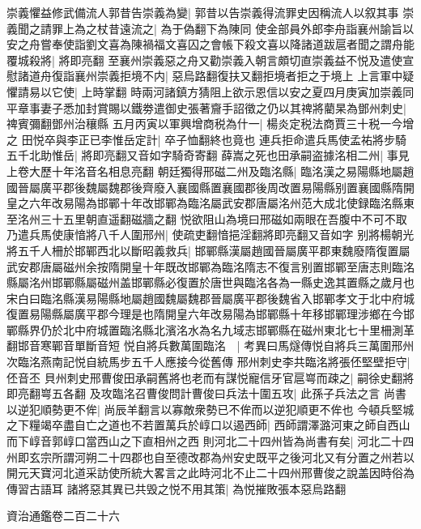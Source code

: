 崇義懼益修武備流人郭昔告崇義為變|{
	郭昔以告崇義得流罪史因稱流人以叙其事}
崇義聞之請罪上為之杖昔遠流之|{
	為于偽翻下為陳同}
使金部員外郎李舟詣襄州諭旨以安之舟嘗奉使詣劉文喜為陳禍福文喜囚之會帳下殺文喜以降諸道跋扈者聞之謂舟能覆城殺將|{
	將即亮翻}
至襄州崇義惡之舟又勸崇義入朝言頗切直崇義益不悦及遣使宣慰諸道舟復詣襄州崇義拒境不内|{
	惡烏路翻復扶又翻拒境者拒之于境上}
上言軍中疑懼請易以它使|{
	上時掌翻}
時兩河諸鎮方猜阻上欲示恩信以安之夏四月庚寅加崇義同平章事妻子悉加封賞賜以鐵劵遣御史張著齎手詔徵之仍以其禆將藺杲為鄧州刺史|{
	禆賓彌翻鄧州治穰縣}
五月丙寅以軍興增商税為什一|{
	楊炎定税法商賈三十税一今增之}
田悦卒與李正已李惟岳定計|{
	卒子恤翻終也竟也}
連兵拒命遣兵馬使孟祐將步騎五千北助惟岳|{
	將即亮翻又音如字騎奇寄翻}
薛嵩之死也田承嗣盗據洺相二州|{
	事見上卷大歷十年洺音名相息亮翻}
朝廷獨得邢磁二州及臨洺縣|{
	臨洺漢之易陽縣地屬趙國晉屬廣平郡後魏屬魏郡後齊廢入襄國縣置襄國郡後周改置易陽縣别置襄國縣隋開皇之六年改易陽為邯鄲十年改邯鄲為臨洺屬武安郡唐屬洺州范大成北使録臨洺縣東至洺州三十五里朝直遥翻磁牆之翻}
悦欲阻山為境曰邢磁如兩眼在吾腹中不可不取乃遣兵馬使康愔將八千人圍邢州|{
	使疏吏翻愔挹淫翻將即亮翻又音如字}
别將楊朝光將五千人柵於邯鄲西北以斷昭義救兵|{
	邯鄲縣漢屬趙國晉屬廣平郡東魏廢隋復置屬武安郡唐屬磁州余按隋開皇十年既改邯鄲為臨洺隋志不復言别置邯鄲至唐志則臨洺縣屬洺州邯鄲縣屬磁州盖邯鄲縣必復置於唐世與臨洺各為一縣史逸其置縣之歲月也宋白曰臨洺縣漢易陽縣地屬趙國魏屬魏郡晉屬廣平郡後魏省入邯鄲孝文于北中府城復置易陽縣屬廣平郡今理是也隋開皇六年改易陽為邯鄲縣十年移邯鄲理涉鄉在今邯鄲縣界仍於北中府城置臨洺縣北濱洺水為名九域志邯鄲縣在磁州東北七十里柵測革翻邯音寒鄲音單斷音短}
悦自將兵數萬圍臨洺　|{
	考異曰馬燧傳悦自將兵三萬圍邢州次臨洺燕南記悦自統馬步五千人應接今從舊傳}
邢州刺史李共臨洺將張伾堅壁拒守|{
	伾音丕}
貝州刺史邢曹俊田承嗣舊將也老而有謀悦寵信牙官扈㟧而疎之|{
	嗣徐史翻將即亮翻㟧五各翻}
及攻臨洺召曹俊問計曹俊曰兵法十圍五攻|{
	此孫子兵法之言}
尚書以逆犯順勢更不侔|{
	尚辰羊翻言以寡敵衆勢已不侔而以逆犯順更不侔也}
今頓兵堅城之下糧竭卒盡自亡之道也不若置萬兵於崞口以遏西師|{
	西師謂澤潞河東之師自西山而下崞音郭崞口當西山之下直相州之西}
則河北二十四州皆為尚書有矣|{
	河北二十四州即玄宗所謂河朔二十四郡也自至德改郡為州安史既平之後河北又有分置之州若以開元天寶河北道采訪使所統大畧言之此時河北不止二十四州邢曹俊之說盖因時俗為傳習古語耳}
諸將惡其異已共毁之悦不用其策|{
	為悦摧敗張本惡烏路翻}


資治通鑑卷二百二十六
